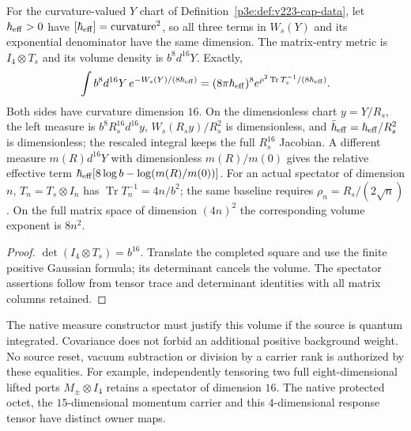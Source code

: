 \documentclass[12pt,a4paper]{article}
\begin{document}
\begin{proposition}
\label{p3e:prop:v223-source-volume}
For the curvature-valued $Y$ chart of
Definition~\ref{p3e:def:v223-cap-data}, let $\hbar_{\rm eff}>0$ have
$[\hbar_{\rm eff}]=\text{curvature}^2$, so all three terms in
$W_s(Y)$ and its exponential denominator have the same dimension.
The matrix-entry metric is $I_4\otimes T_s$ and its volume density is
$b^8d^{16}Y$.  Exactly,
\[
 \int b^8d^{16}Y\,
 e^{-W_s(Y)/(8\hbar_{\rm eff})}
 =(8\pi\hbar_{\rm eff})^8
 e^{\rho^2\operatorname{Tr}T_s^{-1}/(8\hbar_{\rm eff})}.
\]
Both sides have curvature dimension $16$.  On the dimensionless chart
$y=Y/R_s$, the left measure is $b^8R_s^{16}d^{16}y$,
$W_s(R_sy)/R_s^2$ is dimensionless, and
$\bar\hbar_{\rm eff}=\hbar_{\rm eff}/R_s^2$ is dimensionless;
the rescaled integral keeps the full $R_s^{16}$ Jacobian.
A different measure $m(R)d^{16}Y$ with dimensionless
$m(R)/m(0)$ gives the relative effective term
$\hbar_{\rm eff}[8\log b-\log(m(R)/m(0))]$.
For an actual spectator of dimension $n$, $T_n=T_s\otimes I_n$ has
$\operatorname{Tr}T_n^{-1}=4n/b^2$; the same baseline requires
$\rho_n=R_s/(2\sqrt n)$.  On the full matrix space of dimension
$(4n)^2$ the corresponding volume exponent is $8n^2$.
\end{proposition}
\begin{proof}
$\det(I_4\otimes T_s)=b^{16}$.  Translate the completed square and
use the finite positive Gaussian formula; its determinant cancels the
volume.  The spectator assertions follow from tensor trace and
determinant identities with all matrix columns retained.
\end{proof}
The native measure constructor must justify this volume if the source
is quantum integrated.  Covariance does not forbid an additional
positive background weight.  No source reset, vacuum subtraction or
division by a carrier rank is authorized by these equalities.  For
example, independently tensoring two full eight-dimensional lifted
ports $M_\pm\otimes I_4$ retains a spectator of dimension $16$.
The native protected octet, the $15$-dimensional momentum carrier and
this $4$-dimensional response tensor have distinct owner maps.
\end{document}

